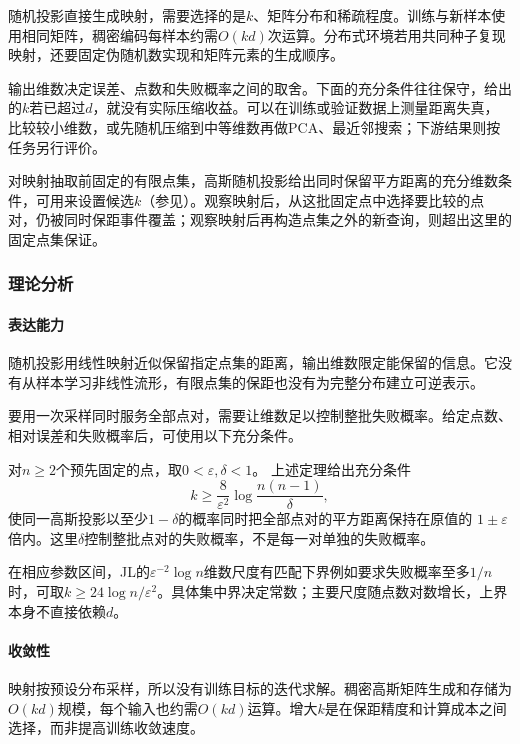 随机投影直接生成映射，需要选择的是$k$、矩阵分布和稀疏程度。训练与新样本使用相同矩阵，稠密编码每样本约需$O(kd)$次运算。分布式环境若用共同种子复现映射，还要固定伪随机数实现和矩阵元素的生成顺序。

输出维数决定误差、点数和失败概率之间的取舍。下面的充分条件往往保守，给出的$k$若已超过$d$，就没有实际压缩收益。可以在训练或验证数据上测量距离失真，比较较小维数，或先随机压缩到中等维数再做PCA、最近邻搜索；下游结果则按任务另行评价。

对映射抽取前固定的有限点集，高斯随机投影给出同时保留平方距离的充分维数条件，可用来设置候选$k$（参见）。观察映射后，从这批固定点中选择要比较的点对，仍被同时保距事件覆盖；观察映射后再构造点集之外的新查询，则超出这里的固定点集保证。

\subsubsection{理论分析}
\label{sec:dim-rp-theory}

\paragraph{表达能力}
随机投影用线性映射近似保留指定点集的距离，输出维数限定能保留的信息。它没有从样本学习非线性流形，有限点集的保距也没有为完整分布建立可逆表示。

要用一次采样同时服务全部点对，需要让维数足以控制整批失败概率。给定点数、相对误差和失败概率后，可使用以下充分条件。

对$n\geq2$个预先固定的点，取$0<\varepsilon,\delta<1$。
上述定理给出充分条件
\[
  k\geq\frac{8}{\varepsilon^2}\log\frac{n(n-1)}{\delta},
\]
使同一高斯投影以至少$1-\delta$的概率同时把全部点对的平方距离保持在原值的
$1\pm\varepsilon$倍内。这里$\delta$控制整批点对的失败概率，不是每一对单独的失败概率。

在相应参数区间，JL的$\varepsilon^{-2}\log n$维数尺度有匹配下界例如要求失败概率至多$1/n$时，可取$k\geq24\log n/\varepsilon^2$。具体集中界决定常数；主要尺度随点数对数增长，上界本身不直接依赖$d$。

\paragraph{收敛性}
映射按预设分布采样，所以没有训练目标的迭代求解。稠密高斯矩阵生成和存储为$O(kd)$规模，每个输入也约需$O(kd)$运算。增大$k$是在保距精度和计算成本之间选择，而非提高训练收敛速度。

